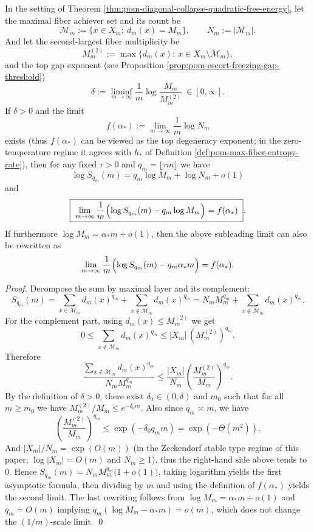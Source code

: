 \begin{theorem}\label{thm:pom-diagonal-subleading-top-degeneracy}
In the setting of Theorem \ref{thm:pom-diagonal-collapse-quadratic-free-energy},
let the maximal fiber achiever set and its count be
\[
\mathcal{M}_m:=\{x\in X_m:\ d_m(x)=M_m\},
\qquad
N_m:=|\mathcal{M}_m|.
\]
And let the second-largest fiber multiplicity be
\[
M_m^{(2)}:=\max\{d_m(x):\ x\in X_m\setminus\mathcal{M}_m\},
\]
and the top gap exponent (see Proposition \ref{prop:pom-escort-freezing-gap-threshold})
\[
\delta:=\liminf_{m\to\infty}\frac{1}{m}\log\frac{M_m}{M_m^{(2)}}\ \in[0,\infty].
\]
If \(\delta>0\) and the limit
\[
f(\alpha_\ast):=\lim_{m\to\infty}\frac{1}{m}\log N_m
\]
exists (thus \(f(\alpha_\ast)\) can be viewed as the top degeneracy exponent; in the zero-temperature regime it agrees with \(h_\ast\) of Definition \ref{def:pom-max-fiber-entropy-rate}),
then for any fixed \(\tau>0\) and \(q_m=\lfloor\tau m\rfloor\) we have
\[
\boxed{\;
\log S_{q_m}(m)=q_m\log M_m+\log N_m+o(1)\;}
\]
and
\[
\boxed{\;
\lim_{m\to\infty}\frac{1}{m}\Bigl(\log S_{q_m}(m)-q_m\log M_m\Bigr)=f(\alpha_\ast)\; }.
\]
If furthermore \(\log M_m=\alpha_\ast m+o(1)\), then the above subleading limit can also be rewritten as
\[
\lim_{m\to\infty}\frac{1}{m}\Bigl(\log S_{q_m}(m)-q_m\alpha_\ast m\Bigr)=f(\alpha_\ast).
\]
\end{theorem}
\begin{proof}
Decompose the sum by maximal layer and its complement:
\[
S_{q_m}(m)=\sum_{x\in\mathcal{M}_m}d_m(x)^{q_m}+\sum_{x\notin\mathcal{M}_m}d_m(x)^{q_m}
=N_m M_m^{q_m}+\sum_{x\notin\mathcal{M}_m}d_m(x)^{q_m}.
\]
For the complement part, using \(d_m(x)\le M_m^{(2)}\) we get
\[
0\le \sum_{x\notin\mathcal{M}_m}d_m(x)^{q_m}\le |X_m|\,(M_m^{(2)})^{q_m}.
\]
Therefore
\[
\frac{\sum_{x\notin\mathcal{M}_m}d_m(x)^{q_m}}{N_m M_m^{q_m}}
\le
\frac{|X_m|}{N_m}\left(\frac{M_m^{(2)}}{M_m}\right)^{q_m}.
\]
By the definition of \(\delta>0\), there exist \(\delta_0\in(0,\delta)\) and \(m_0\) such that for all \(m\ge m_0\) we have \(M_m^{(2)}/M_m\le e^{-\delta_0 m}\).
Also since \(q_m\asymp m\), we have
\[
\left(\frac{M_m^{(2)}}{M_m}\right)^{q_m}\le \exp(-\delta_0 q_m m)=\exp(-\Theta(m^2)).
\]
And \(|X_m|/N_m=\exp(O(m))\) (in the Zeckendorf stable type regime of this paper, \(\log|X_m|=O(m)\) and \(N_m\ge 1\)),
thus the right-hand side above tends to \(0\).
Hence
\(
S_{q_m}(m)=N_m M_m^{q_m}\bigl(1+o(1)\bigr)
\),
taking logarithm yields the first asymptotic formula, then dividing by \(m\) and using the definition of \(f(\alpha_\ast)\) yields the second limit.
The last rewriting follows from \(\log M_m=\alpha_\ast m+o(1)\) and \(q_m=O(m)\) implying
\(
q_m(\log M_m-\alpha_\ast m)=o(m)
\),
which does not change the \((1/m)\)-scale limit. \qed
\end{proof}
